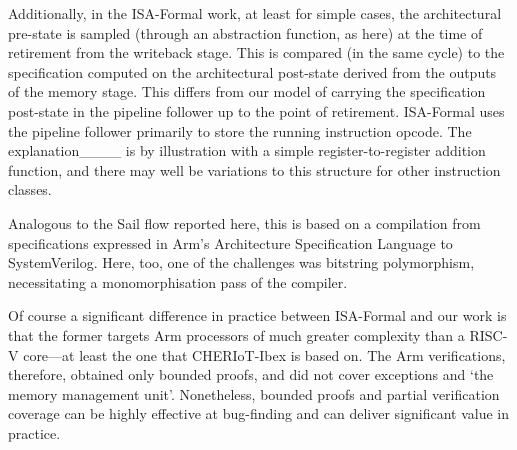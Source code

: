 Additionally, in the ISA-Formal work, at least for simple cases, the
architectural pre-state is sampled (through an abstraction function, as here)
at the time of retirement from the writeback stage. This is compared (in the same
cycle) to the specification computed on the architectural post-state derived
from the outputs of the memory stage. This differs from our model of carrying
the specification post-state in the pipeline follower up to the point of retirement.
ISA-Formal uses the pipeline follower primarily to store the running instruction
opcode. The explanation____ is
by illustration with a simple register-to-register addition function, and there
may well be variations to this structure for other instruction classes.

Analogous to the Sail flow reported here, this is based on a compilation
from specifications expressed in Arm's Architecture Specification Language
to SystemVerilog. Here, too, one of the challenges was bitstring
polymorphism, necessitating a monomorphisation pass of the compiler.

Of course a significant difference in practice between ISA-Formal and our
work is that the former targets Arm processors of much greater complexity
than a RISC-V core---at least the one that CHERIoT-Ibex is based on. The
Arm verifications, therefore, obtained only bounded proofs, and
did not cover exceptions and `the memory management unit'.  Nonetheless,
bounded proofs and partial verification coverage can be highly effective at
bug-finding and can deliver significant value in practice.